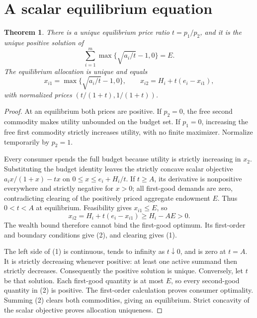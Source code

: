 \documentclass[11pt]{article}
\newtheorem{theorem}{Theorem}
\theoremstyle{definition}
\begin{document}
\section*{A scalar equilibrium equation}
\begin{theorem}
There is a unique equilibrium price ratio $t=p_1/p_2$, and it is the
unique positive solution of
\[
 \sum_{i=1}^m \max\{\sqrt{a_i/t}-1,0\}=E.                 \tag{1}
\]
The equilibrium allocation is unique and equals
\[
 x_{i1}=\max\{\sqrt{a_i/t}-1,0\},\qquad
 x_{i2}=H_i+t(e_i-x_{i1}),                               \tag{2}
\]
with normalized prices $(t/(1+t),1/(1+t))$.
\end{theorem}
\begin{proof}
At an equilibrium both prices are positive. If $p_2=0$, the free second
commodity makes utility unbounded on the budget set. If $p_1=0$, increasing
the free first commodity strictly increases utility, with no finite
maximizer. Normalize temporarily by $p_2=1$.

Every consumer spends the full budget because utility is strictly
increasing in $x_2$. Substituting the budget identity leaves the strictly
concave scalar objective
$a_i x/(1+x)-tx$ on
$0\le x\le e_i+H_i/t$. If $t\ge A$, its derivative is nonpositive
everywhere and strictly negative for $x>0$; all first-good demands are zero,
contradicting clearing of the positively priced aggregate endowment $E$.
Thus $0<t<A$ at equilibrium. Feasibility gives $x_{i1}\le E$, so
\[
 x_{i2}=H_i+t(e_i-x_{i1})\ge H_i-AE>0.
\]
The wealth bound therefore cannot bind the first-good optimum. Its
first-order and boundary conditions give (2), and clearing gives (1).

The left side of (1) is continuous, tends to infinity as $t\downarrow0$,
and is zero at $t=A$. It is strictly decreasing whenever positive: at
least one active summand then strictly decreases. Consequently the positive
solution is unique. Conversely, let $t$ be that solution. Each first-good
quantity is at most $E$, so every second-good quantity in (2) is positive.
The first-order calculation proves consumer optimality. Summing (2) clears
both commodities, giving an equilibrium. Strict concavity of the scalar
objective proves allocation uniqueness.
\end{proof}
\end{document}
